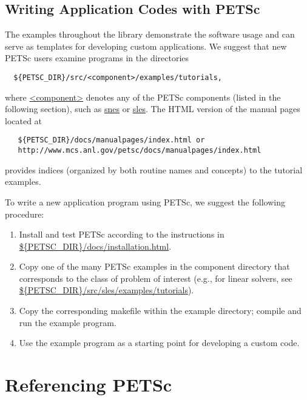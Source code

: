 \subsection*{Writing Application Codes with PETSc}

The examples throughout the library demonstrate the software usage
and can serve as templates for developing
custom applications.  We suggest that new PETSc
users examine programs in the directories 
\begin{verbatim}
  ${PETSC_DIR}/src/<component>/examples/tutorials,
\end{verbatim}
where \url{<component>}
denotes any of the PETSc components (listed in the following
section), such as \url{snes} or \url{sles}.  
The HTML version of the manual pages located at
\begin{verbatim}
   ${PETSC_DIR}/docs/manualpages/index.html or 
   http://www.mcs.anl.gov/petsc/docs/manualpages/index.html
\end{verbatim}
provides indices (organized by both routine names and concepts) to the tutorial examples.

To write a new application program using PETSc, we suggest the
following procedure:
\begin{enumerate}
\item Install and test PETSc according to the instructions in 
      \url{${PETSC_DIR}/docs/installation.html}.
\item Copy one of the many PETSc examples in the component directory
      that corresponds to the class of problem of interest (e.g.,
      for linear solvers, see \url{${PETSC_DIR}/src/sles/examples/tutorials}).
\item Copy the corresponding makefile within the example directory;
      compile and run the example program.
\item Use the example program as a starting point for developing a custom code.
\end{enumerate}


\section{Referencing PETSc}

